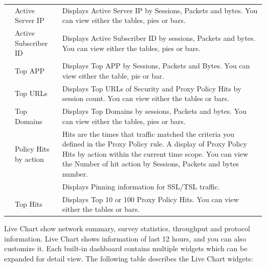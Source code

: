 \begin{longtable}{p{}|p{}|p{}}
                               & Active Server IP & Displays Active Server IP by Sessions, Packets and bytes. You can view either the tables, pies or bars. \\ 
                               & Active Subscriber ID & Displays Active Subscriber ID by sessions, Packets and bytes. You can view either the tables, pies or bars. \\ 
                               & Top APP & Displays Top APP by Sessions, Packets and Bytes. You can view either the table, pie or bar. \\ 
                               & Top URLs & Displays Top URLs of Security and Proxy Policy Hits by session count. You can view either the tables or bars. \\ 
                               & Top Domains & Displays Top Domains by sessions, Packets and bytes. You can view either the tables, pies or bars. \\ \hline
     & Policy Hits by action & Hits are the times that traffic matched the criteria you defined in the Proxy Policy rule. A display of Proxy Policy Hits by action within the current time scope. You can view the Number of hit action by Sessions, Packets and bytes number. \\ 
                                                        &  & Displays Pinning information for SSL/TSL traffic. \\ 
                                                        & Top Hits & Displays Top 10 or 100 Proxy Policy Hits. You can view either the tables or bars. \\ \hline                                                                                               
\end{longtable}


Live Chart show network summary, survey statistics, throughput and protocol information. Live Chart shows information of last 12 hours, and you can also customize it. Each built-in dashboard contains multiple widgets which can be expanded for detail view. The following table describes the Live Chart widgets:


